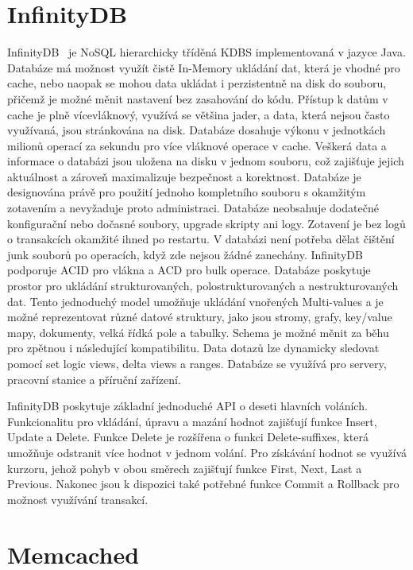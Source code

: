 \documentclass[czech,master,dept460,male,csharp,cpdeclaration]{diploma}
\begin{document}
	\section{InfinityDB}
	
	InfinityDB~\cite{infinitydb} je NoSQL hierarchicky tříděná KDBS implementovaná v jazyce Java. Databáze má možnost využít čistě In-Memory ukládání dat, která je vhodné pro cache, nebo naopak se mohou data ukládat i perzistentně na disk do souboru, přičemž je možné měnit nastavení bez zasahování do kódu. Přístup k datům v cache je plně vícevláknový, využívá se většina jader, a data, která nejsou často využívaná, jsou stránkována na disk. Databáze dosahuje výkonu v jednotkách milionů operací za sekundu pro více vláknové operace v cache. Veškerá data a informace o databázi jsou uložena na disku v jednom souboru, což zajišťuje jejich aktuálnost a zároveň maximalizuje bezpečnost a korektnost. Databáze je designována právě pro použití jednoho kompletního souboru s okamžitým zotavením a nevyžaduje proto administraci. Databáze neobsahuje dodatečné konfigurační nebo dočasné soubory, upgrade skripty ani logy. Zotavení je bez logů o transakcích okamžité ihned po restartu. V databázi není potřeba dělat čištění junk souborů po operacích, když zde nejsou žádné zanechány. InfinityDB podporuje ACID pro vlákna a ACD pro bulk operace. Databáze poskytuje prostor pro ukládání strukturovaných, polostrukturovaných a nestrukturovaných dat. Tento jednoduchý model umožňuje ukládání vnořených Multi-values a je možné reprezentovat různé datové struktury, jako jsou stromy, grafy, key/value mapy, dokumenty, velká řídká pole a tabulky. Schema je možné měnit za běhu pro zpětnou i následující kompatibilitu. Data dotazů lze dynamicky sledovat pomocí set logic views, delta views a ranges. Databáze se využívá pro servery, pracovní stanice a příruční zařízení.
	
	InfinityDB poskytuje základní jednoduché API o deseti hlavních voláních. Funkcionalitu pro vkládání, úpravu a mazání hodnot zajišťují funkce Insert, Update a Delete. Funkce Delete je rozšířena o funkci Delete-suffixes, která umožňuje odstranit více hodnot v jednom volání. Pro získávání hodnot se využívá kurzoru, jehož pohyb v obou směrech zajišťují funkce First, Next, Last a Previous. Nakonec jsou k dispozici také potřebné funkce Commit a Rollback pro možnost využívání transakcí.
	
	\section{Memcached}
	
\end{document}
